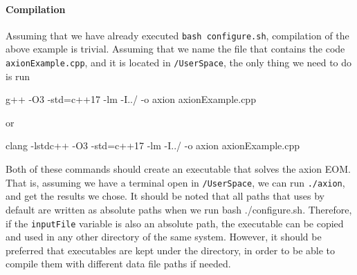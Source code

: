 \documentclass[11pt,a4paper]{article}
\begin{document}
\paragraph{Compilation}
%
Assuming that we have already executed {\tt bash configure.sh}, compilation of the above example is trivial. Assuming that we name the file that contains the code {\tt axionExample.cpp}, and it is located in {\tt \mimes/UserSpace}, the only thing we need to do is run
%
\begin{pseudo}
	g++ -O3 -std=c++17 -lm -I../ -o axion axionExample.cpp
\end{pseudo}
%
or 
%
\begin{pseudo}
	clang -lstdc++ -O3 -std=c++17 -lm -I../ -o axion axionExample.cpp
\end{pseudo}

Both of these commands should create an executable that solves the axion EOM. That is, assuming we have a terminal open in   {\tt \mimes/UserSpace}, we can run {\tt ./axion}, and get the results we chose. It should be noted that all paths that \mimes uses by default are written as absolute paths when we run {bash ./configure.sh}. Therefore, if the {\tt inputFile} variable is also an absolute path, the executable can be copied and used in any other directory of the same system. However, it should be preferred that executables are kept under the \mimes directory, in order to be able to compile them with different data file paths if needed.
\end{document}
